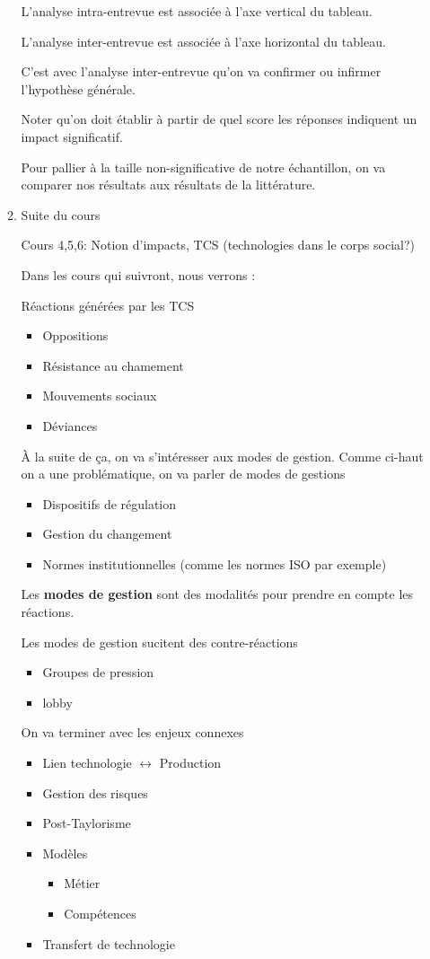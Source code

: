 \documentclass[11pt]{article}
\begin{document}
\begin{enumerate}
\begin{enumerate}
L'analyse intra-entrevue est associée à l'axe vertical du tableau.

L'analyse inter-entrevue est associée à l'axe horizontal du tableau.

C'est avec l'analyse inter-entrevue qu'on va confirmer ou infirmer l'hypothèse
générale.

Noter qu'on doit établir à partir de quel score les réponses indiquent un
impact significatif.

Pour pallier à la taille non-significative de notre échantillon, on va comparer
nos résultats aux résultats de la littérature.

\item Suite du cours
\label{sec:org2943924}

Cours 4,5,6:  Notion d'impacts, TCS (technologies dans le corps social?)

Dans les cours qui suivront, nous verrons :

Réactions générées par les TCS
\begin{itemize}
\item Oppositions
\item Résistance au chamement
\item Mouvements sociaux
\item Déviances
\end{itemize}

À la suite de ça, on va s'intéresser aux modes de gestion.  Comme ci-haut on a
une problématique, on va parler de modes de gestions
\begin{itemize}
\item Dispositifs de régulation
\item Gestion du changement
\item Normes institutionnelles (comme les normes ISO par exemple)
\end{itemize}

Les \textbf{modes de gestion} sont des modalités pour prendre en compte les réactions.

Les modes de gestion sucitent des contre-réactions
\begin{itemize}
\item Groupes de pression
\item lobby
\end{itemize}

On va terminer avec les enjeux connexes
\begin{itemize}
\item Lien technologie \(\leftrightarrow\) Production
\item Gestion des risques
\item Post-Taylorisme
\item Modèles
\begin{itemize}
\item Métier
\item Compétences
\end{itemize}
\item Transfert de technologie
\end{itemize}
\end{enumerate}


\end{enumerate}
\end{document}
